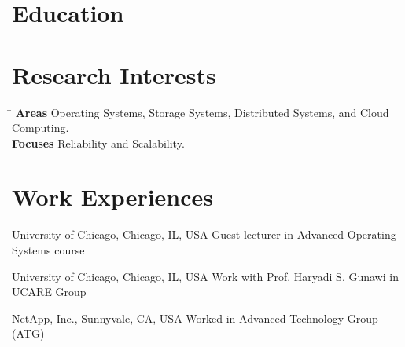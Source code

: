 \documentclass[10pt]{article} %
\begin{document}
\section{Education}





\section{Research Interests}

\begin{tabbing}
\hspace{2.5cm} \= \kill
\textbf{Areas} \> Operating Systems, Storage Systems, Distributed Systems, and Cloud Computing. \\
\textbf{Focuses} \> Reliability and Scalability.
\end{tabbing}


\section{Work Experiences}

{University of Chicago, Chicago, IL, USA}
{Guest lecturer in Advanced Operating Systems course} 

{University of Chicago, Chicago, IL, USA}
{Work with Prof. Haryadi S. Gunawi in UCARE Group} 

{NetApp, Inc., Sunnyvale, CA, USA}
{Worked in Advanced Technology Group (ATG)} 
\end{document}

